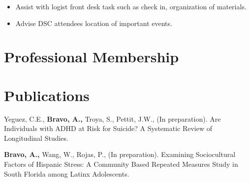\documentclass[11pt,a4paper,]{awesome-cv}
\begin{document}
\begin{cventries}
{\begin{cvitems}
\begin{itemize}
    \item Assist with logist front desk task such as check in, organization of materials.
    \item Advise DSC attendees location of important events.
  \end{itemize}
\end{cvitems}}
\end{cventries}

\hypertarget{professional-membership}{%
\section{Professional Membership}\label{professional-membership}}

\begin{cventries}
    \vspace{-4.0mm}
    \vspace{-4.0mm}
\end{cventries}

\hypertarget{publications}{%
\section{Publications}\label{publications}}

Yeguez, C.E., \textbf{Bravo, A.,} Troya, S., Pettit, J.W., (In
preparation). Are Individuals with ADHD at Risk for Suicide? A
Systematic Review of Longitudinal Studies.

\textbf{Bravo, A.,} Wang, W., Rojas, P., (In preparation). Examining
Sociocultural Factors of Hispanic Stress: A Community Based Repeated
Measures Study in South Florida among Latinx Adolescents.


\label{LastPage}~
\end{document}
